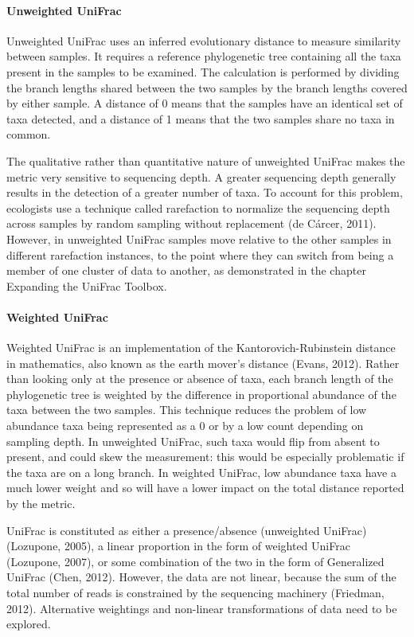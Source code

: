 \paragraph{Unweighted UniFrac}
Unweighted UniFrac uses an inferred evolutionary distance to measure similarity between samples. It requires a reference phylogenetic tree containing all the taxa present in the samples to be examined. The calculation is performed by dividing the branch lengths shared between the two samples by the branch lengths covered by either sample. A distance of 0 means that the samples have an identical set of taxa detected, and a distance of 1 means that the two samples share no taxa in common.

The qualitative rather than quantitative nature of unweighted UniFrac makes the metric very sensitive to sequencing depth. A greater sequencing depth generally results in the detection of a greater number of taxa. To account for this problem, ecologists use a technique called rarefaction to normalize the sequencing depth across samples by random sampling without replacement (de Cárcer, 2011). However, in unweighted UniFrac samples move relative to the other samples in different rarefaction instances, to the point where they can switch from being a member of one cluster of data to another, as demonstrated in the chapter Expanding the UniFrac Toolbox.

\paragraph{Weighted UniFrac}
Weighted UniFrac is an implementation of the Kantorovich-Rubinstein distance in mathematics, also known as the earth mover's distance (Evans, 2012). Rather than looking only at the presence or absence of taxa, each branch length of the phylogenetic tree is weighted by the difference in proportional abundance of the taxa between the two samples. This technique reduces the problem of low abundance taxa being represented as a 0 or by a low count depending on sampling depth. In unweighted UniFrac, such taxa would flip from absent to present, and could skew the measurement: this would be especially problematic if the taxa are on a long branch. In weighted UniFrac, low abundance taxa have a much lower weight and so will have a lower impact on the total distance reported by the metric.

UniFrac is constituted as either a presence/absence (unweighted UniFrac) (Lozupone, 2005), a linear proportion in the form of weighted UniFrac (Lozupone, 2007), or some combination of the two in the form of Generalized UniFrac (Chen, 2012). However, the data are not linear, because the sum of the total number of reads is constrained by the sequencing machinery (Friedman, 2012). Alternative weightings and non-linear transformations of data need to be explored.

